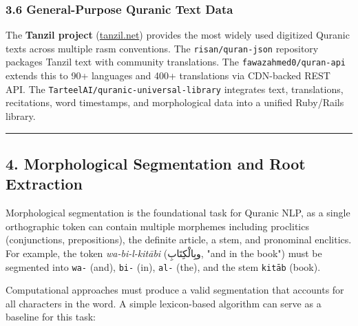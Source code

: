 \documentclass[12pt,a4paper]{article}
\begin{document}
\subsubsection{3.6 General-Purpose Quranic Text Data}\label{s3-6}

The \textbf{Tanzil project} (\href{https://tanzil.net}{tanzil.net})
provides the most widely used digitized Quranic texts across multiple
rasm conventions. The \texttt{risan/quran-json} repository packages
Tanzil text with community translations. The
\texttt{fawazahmed0/quran-api} extends this to 90+ languages and 400+
translations via CDN-backed REST API. The
\texttt{TarteelAI/quranic-universal-library} integrates text,
translations, recitations, word timestamps, and morphological data into
a unified Ruby/Rails library.

\begin{center}\rule{0.5\linewidth}{0.5pt}\end{center}

\protect{}\label{s4}
\subsection{4. Morphological Segmentation and Root
Extraction}\label{morphological-segmentation-and-root-extraction}

Morphological segmentation is the foundational task for Quranic NLP, as
a single orthographic token can contain multiple morphemes including
proclitics (conjunctions, prepositions), the definite article, a stem,
and pronominal enclitics. For example, the token \emph{wa-bi-l-kitābi}
(وبِالْكِتَابِ, "and in the book") must be segmented into \texttt{wa-} (and),
\texttt{bi-} (in), \texttt{al-} (the), and the stem \texttt{kitāb}
(book).

Computational approaches must produce a valid segmentation that accounts
for all characters in the word. A simple lexicon-based algorithm can
serve as a baseline for this task:
\end{document}
